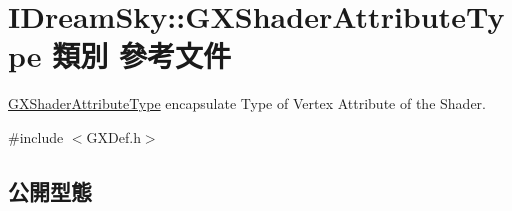 \hypertarget{class_i_dream_sky_1_1_g_x_shader_attribute_type}{}\section{I\+Dream\+Sky\+:\+:G\+X\+Shader\+Attribute\+Type 類別 參考文件}
\label{class_i_dream_sky_1_1_g_x_shader_attribute_type}


\hyperlink{class_i_dream_sky_1_1_g_x_shader_attribute_type}{G\+X\+Shader\+Attribute\+Type} encapsulate Type of Vertex Attribute of the Shader.  




{\ttfamily \#include $<$G\+X\+Def.\+h$>$}

\subsection*{公開型態}
